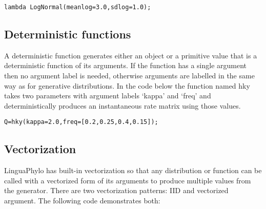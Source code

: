 \documentclass[10pt,letterpaper,table]{article}
\begin{document}
{\singlespacing
\begin{alltt}
  lambda ~ LogNormal(meanlog=3.0, sdlog=1.0);
\end{alltt}
}

\subsection*{Deterministic functions}

A deterministic function generates either an object or a primitive value that is a deterministic function of its arguments. If the function has a single argument then no argument label is needed, otherwise arguments are labelled in the same way as for generative distributions. In the code below the function named hky takes two parameters with argument labels `kappa' and `freq' and deterministically produces an instantaneous rate matrix using those values.

{\singlespacing
\begin{alltt}
  Q = hky(kappa=2.0, freq=[0.2, 0.25, 0.4, 0.15]);
\end{alltt}
}

\subsection*{Vectorization}

LinguaPhylo has built-in vectorization so that any distribution or function can be called with a vectorized form of its arguments to produce multiple values from the generator. There are two vectorization patterns: IID and vectorized argument. The following code demonstrates both:
\end{document}
